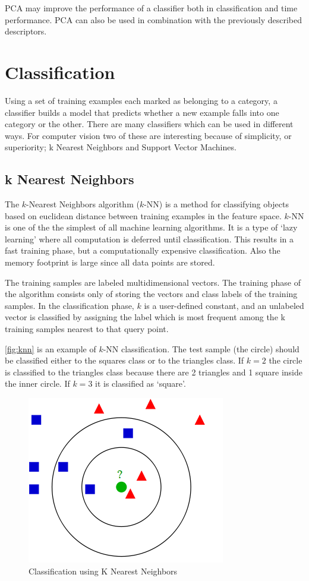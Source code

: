 PCA may improve the performance of a classifier both in classification and time performance. PCA can also be used in combination with the previously described descriptors.
                      
\section{Classification}
Using a set of training examples each marked as belonging to a category, a classifier builds a model that predicts whether a new example falls into one category or the other. There are many classifiers which can be used in different ways. For computer vision two of these are interesting because of simplicity, or superiority; k Nearest Neighbors and Support Vector Machines.

\subsection*{k Nearest Neighbors}
The $k$-Nearest Neighbors algorithm ($k$-NN) is a method for classifying objects based on euclidean distance between training examples in the feature space. $k$-NN is one of the the simplest of all machine learning  algorithms. It is a type of `lazy learning' where all computation is deferred until classification. This results in a fast training phase, but a computationally expensive classification. Also the memory footprint is large since all data points are stored. 

The training samples are labeled multidimensional vectors. The training phase of the algorithm consists only of storing the vectors and class labels of the training samples. In the classification phase, $k$ is a user-defined constant, and an unlabeled vector is classified by assigning the label which is most frequent among the k training samples nearest to that query point.

\autoref{fig:knn} is an example of $k$-NN classification. The test sample (the circle) should be classified either to the squares class or to the triangles class. If $k = 2$ the circle is classified to the triangles class because there are 2 triangles and 1 square inside the inner circle. If $k = 3$ it is classified as `square'.

\begin{figure}[tb]
\center{}
\includegraphics[width=0.5\linewidth]{figures/knn.png}
\caption{Classification using K Nearest Neighbors}
\label{fig:knn}
\end{figure}




